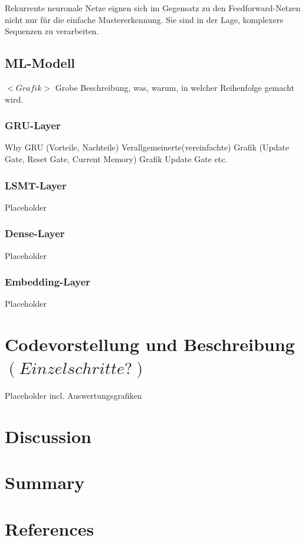 \documentclass[12pt,a4paper]{article}
\begin{document}
Rekurrente neuronale Netze eignen sich im Gegensatz zu den Feedforward-Netzen nicht nur für die einfache Mustererkennung. Sie sind in der Lage, komplexere Sequenzen zu verarbeiten. 

\subsection{ML-Modell}
$<Grafik>$ \newline
Grobe Beschreibung, was, warum, in welcher Reihenfolge gemacht wird.
\subsubsection{GRU-Layer}
Why GRU (Vorteile, Nachteile) \newline
Verallgemeinerte(vereinfachte) Grafik (Update Gate, Reset Gate, Current Memory)\newline
Grafik Update Gate\newline
etc.
\subsubsection{LSMT-Layer}
Placeholder
\subsubsection{Dense-Layer}
Placeholder
\subsubsection{Embedding-Layer}
Placeholder
\section{Codevorstellung und Beschreibung$(Einzelschritte?)$}
Placeholder incl. Auswertungsgrafiken
\newpage

\section{Discussion}
\section{Summary}
\section{References}
\end{document}
